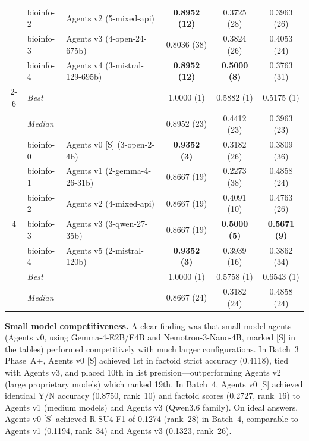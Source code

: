 \begin{table}[ht]
\begin{tabular}{cl|p{5.5cm}|ccc}
    & bioinfo-2 & Agents v2 (5-mixed-api) & \textbf{0.8952 (12)} & 0.3725 (28) & 0.3963 (26) \\
    & bioinfo-3 & Agents v3 (4-open-24-675b) & 0.8036 (38) & 0.3824 (26) & 0.4053 (24) \\
    & bioinfo-4 & Agents v4 (3-mistral-129-695b) & \textbf{0.8952 (12)} & \textbf{0.5000 (8)} & 0.3763 (31) \\
    \cmidrule(l){2-6}
    & \textit{Best} & \multicolumn{1}{l|}{} & 1.0000 (1) & 0.5882 (1) & 0.5175 (1) \\
    & \textit{Median}& \multicolumn{1}{l|}{} & 0.8952 (23) & 0.4412 (23) & 0.3963 (23) \\
    \midrule
    \multirow{7}{*}{4}
    & bioinfo-0 & Agents v0 [S] (3-open-2-4b) & \textbf{0.9352 (3)} & 0.3182 (26) & 0.3809 (36) \\
    & bioinfo-1 & Agents v1 (2-gemma-4-26-31b) & 0.8667 (19) & 0.2273 (38) & 0.4858 (24) \\
    & bioinfo-2 & Agents v2 (4-mixed-api) & 0.8667 (19) & 0.4091 (10) & 0.4763 (26) \\
    & bioinfo-3 & Agents v3 (3-qwen-27-35b) & 0.8667 (19) & \textbf{0.5000 (5)} & \textbf{0.5671 (9)} \\
    & bioinfo-4 & Agents v5 (2-mistral-120b) & \textbf{0.9352 (3)} & 0.3939 (16) & 0.3862 (34) \\
    \cmidrule(l){2-6}
    & \textit{Best} & \multicolumn{1}{l|}{} & 1.0000 (1) & 0.5758 (1) & 0.6543 (1) \\
    & \textit{Median}& \multicolumn{1}{l|}{} & 0.8667 (24) & 0.3182 (24) & 0.4858 (24) \\
    \bottomrule
  \end{tabular}
\end{table}

\textbf{Small model competitiveness.} A clear finding was that small model agents (Agents v0, using Gemma-4-E2B/E4B and Nemotron-3-Nano-4B, marked [S] in the tables) performed competitively with much larger configurations. In Batch~3 Phase~A+, Agents v0 [S] achieved 1st in factoid strict accuracy (0.4118), tied with Agents v3, and placed 10th in list precision---outperforming Agents v2 (large proprietary models) which ranked 19th. In Batch~4, Agents v0 [S] achieved identical Y/N accuracy (0.8750, rank~10) and factoid scores (0.2727, rank~16) to Agents v1 (medium models) and Agents v3 (Qwen3.6 family). On ideal answers, Agents v0 [S] achieved R-SU4 F1 of 0.1274 (rank~28) in Batch~4, comparable to Agents v1 (0.1194, rank~34) and Agents v3 (0.1323, rank~26).

